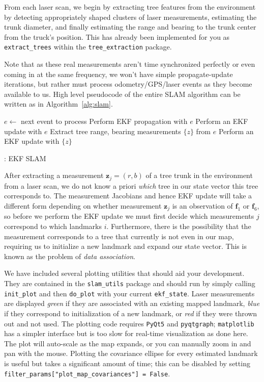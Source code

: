 \documentclass{article}
\newcommand{\mat}[1]{\bm{#1}}
\begin{document}
From each laser scan, we begin by extracting tree features from the environment by detecting appropriately shaped clusters of laser measurements, estimating the trunk diameter, and finally estimating the range and bearing to the trunk center from the truck's position.
This has already been implemented for you as \texttt{extract\_trees} within the \texttt{tree\_extraction} package.

Note that as these real measurements aren't time synchronized perfectly or even coming in at the same frequency, we won't have simple propagate-update iterations, but rather must process odometry/GPS/laser events as they become available to us.
High level pseudocode of the entire SLAM algorithm can be written as in Algorithm~\ref{alg:slam}.
\begin{algorithm}[t]
{\small%
  \begin{algorithmic}[1]
    \State $e \leftarrow$ next event to process
      \State Perform EKF propagation with $e$
      \State Perform an EKF update with $e$
      \State Extract tree range, bearing measurements $\{z\}$ from $e$
      \State Perform an EKF update with $\{z\}$
    \EndIf
    \EndWhile
  \end{algorithmic}
}
\caption{: EKF SLAM}
\label{alg:slam}
\end{algorithm}

After extracting a measurement $\mat{z}_j = (r, b)$ of a tree trunk in the environment from a laser scan, we do not know a priori \emph{which} tree in our state vector this tree corresponds to.
The measurement Jacobians and hence EKF update will take a different form depending on whether measurement $\mat{z}_j$ is an observation of $\mat{f}_1$ or $\mat{f}_6$, so before we perform the EKF update we must first decide which measurements $j$ correspond to which landmarks $i$.
Furthermore, there is the possibility that the measurement corresponds to a tree that currently is not even in our map, requiring us to initialize a new landmark and expand our state vector.
This is known as the problem of \emph{data association}.

We have included several plotting utilities that should aid your development. 
They are contained in the \texttt{slam\_utils} package and should run by simply calling \texttt{init\_plot} and then \texttt{do\_plot} with your current \texttt{ekf\_state}.
Laser measurements are displayed \emph{green} if they are associated with an existing mapped landmark, \emph{blue} if they correspond to initialization of a new landmark, or \emph{red} if they were thrown out and not used. 
The plotting code requires \texttt{PyQt5} and \texttt{pyqtgraph}; \texttt{matplotlib} has a simpler interface but is too slow for real-time visualization as done here.
The plot will auto-scale as the map expands, or you can manually zoom in and pan with the mouse.
Plotting the covariance ellipse for every estimated landmark is useful but takes a significant amount of time; this can be disabled by setting \texttt{filter\_params["plot\_map\_covariances"] = False}.
\end{document}
